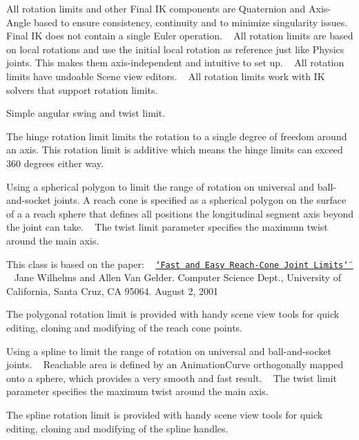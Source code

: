 All rotation limits and other Final IK components are Quaternion and Axis-\/\+Angle based to ensure consistency, continuity and to minimize singularity issues. Final IK does not contain a single Euler operation. ~\newline
All rotation limits are based on local rotations and use the initial local rotation as reference just like Physics joints. This makes them axis-\/independent and intuitive to set up. ~\newline
All rotation limits have undoable Scene view editors. ~\newline
All rotation limits work with IK solvers that support rotation limits.

 

Simple angular swing and twist limit.

  

The hinge rotation limit limits the rotation to a single degree of freedom around an axis. This rotation limit is additive which means the hinge limits can exceed 360 degrees either way.

 

Using a spherical polygon to limit the range of rotation on universal and ball-\/and-\/socket joints. A reach cone is specified as a spherical polygon on the surface of a a reach sphere that defines all positions the longitudinal segment axis beyond the joint can take. ~\newline
The twist limit parameter specifies the maximum twist around the main axis.

This class is based on the paper\+: ~\newline
\href{http://users.soe.ucsc.edu/~avg/Papers/jtl.pdf}{\tt \char`\"{}\+Fast and Easy Reach-\/\+Cone Joint Limits\char`\"{} } ~\newline
Jane Wilhelms and Allen Van Gelder. Computer Science Dept., University of California, Santa Cruz, CA 95064. August 2, 2001

The polygonal rotation limit is provided with handy scene view tools for quick editing, cloning and modifying of the reach cone points.

  

Using a spline to limit the range of rotation on universal and ball-\/and-\/socket joints. ~\newline
Reachable area is defined by an Animation\+Curve orthogonally mapped onto a sphere, which provides a very smooth and fast result. ~\newline
The twist limit parameter specifies the maximum twist around the main axis.

The spline rotation limit is provided with handy scene view tools for quick editing, cloning and modifying of the spline handles. ~\newline
  